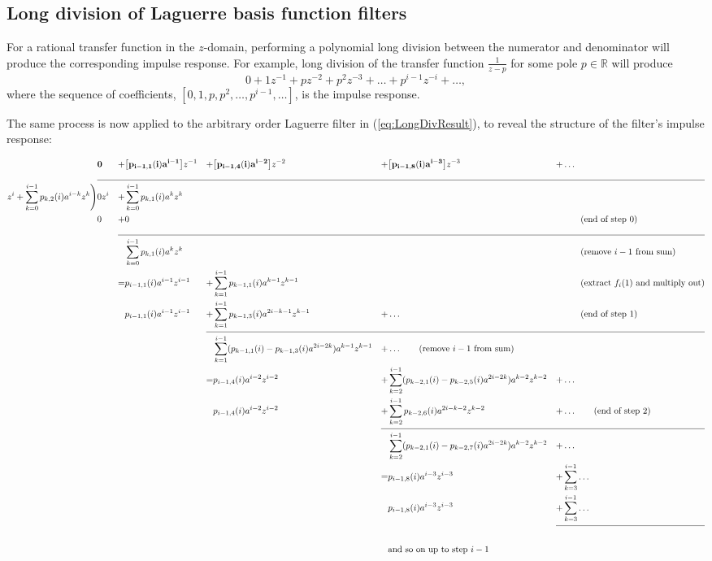 \begin{subappendices}
\section{Long division of Laguerre basis function filters}
\label{append:LongDivision}

For a rational transfer function in the $z$-domain, performing a polynomial long division between the numerator and denominator will produce the corresponding impulse response. For example, long division of the transfer function $\frac{1}{z-p}$ for some pole $p \in \mathbb{R}$ will produce
\begin{equation}
0 + 1z^{-1} + p z^{-2} + p^2 z^{-3} + \hdots + p^{i-1} z^{-i} + \hdots,
\end{equation}
where the sequence of coefficients, $[0, 1, p, p^2, \hdots, p^{i-1}, \hdots]$, is the impulse response.

The same process is now applied to the arbitrary order Laguerre filter in (\ref{eq:LongDivResult}), to reveal the structure of the filter's impulse response: 
\begin{table}

\small

\begin{alignat*}{9}
&\mathbf{0} &+ &\mathbf{\big[p_{i-1,1}(i) a^{i-1} \big]}z^{-1} &+&\mathbf{\big[p_{i-1,4}(i) a^{i-2}\big]} z^{-2} &+&\mathbf{\big[p_{i-1,8}(i) a^{i-3}\big]} z^{-3} &+ &\hdots \\ \cline{2-10} 
z^i + \sum_{k=0}^{i-1} p_{k,2}(i) a^{i-k} z^k \smash{\Bigg)} &0z^i &+ &\sum_{k=0}^{i-1} p_{k,1}(i) a^k z^k & & & \\
&0 &+ &0 &&&&&&	\tag{end of step 0}\\ \cline{3-10} 
&&  &\sum_{k=0}^{i-1} p_{k,1}(i) a^k z^k &&&&&&  \tag{remove $i-1$ from sum}\\
&&= &p_{i-1,1}(i) a^{i-1} z^{i-1} &+ &\sum_{k=1}^{i-1} p_{k-1,1}(i) a^{k-1} z^{k-1} &&&& \tag{extract $f_i(1)$ and multiply out}\\
&& &p_{i-1,1}(i) a^{i-1} z^{i-1} &+ &\sum_{k=1}^{i-1} p_{k-1,3}(i) a^{2i-k-1} z^{k-1} &+ &\hdots && \tag{end of step 1}\\ \cline{5-10} 
&& & & &\sum_{k=1}^{i-1} (p_{k-1,1}(i) - p_{k-1,3}(i)a^{2i-2k}) a^{k-1} z^{k-1} &+ &\hdots \tag{remove $i-1$ from sum}\\
&&& &= &p_{i-1,4}(i)a^{i-2}z^{i-2} &+ &\sum_{k=2}^{i-1} (p_{k-2,1}(i) - p_{k-2,5}(i)a^{2i-2k}) a^{k-2} z^{k-2} &+ &\hdots \\
&&& & &p_{i-1,4}(i)a^{i-2}z^{i-2} &+ &\sum_{k=2}^{i-1} p_{k-2,6}(i)a^{2i-k-2} z^{k-2} &+ &\hdots \tag{end of step 2}\\ \cline{7-10} 
&&& & & & &\sum_{k=2}^{i-1} (p_{k-2,1}(i)-p_{k-2,7}(i)a^{2i-2k})a^{k-2} z^{k-2} &+ &\hdots \\
&&& & & &= &p_{i-1,8}(i)a^{i-3} z^{i-3} &+ &\sum_{k=3}^{i-1} \hdots \\
&&& & & & &p_{i-1,8}(i)a^{i-3} z^{i-3} &+ &\sum_{k=3}^{i-1} \hdots \\ \cline{9-10}  \\
&&& & & & & \text{and so on up to step $i-1$} 
\end{alignat*}


\end{table}
\end{subappendices}
